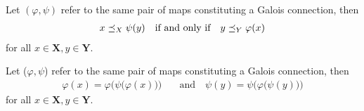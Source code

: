 \begin{proposition}
	\label{proposition:fundamental-galois} Let $(\varphi, \psi)$ refer to the same pair of maps constituting a Galois connection,
	then
	\begin{align}
		\quad & x \preceq_{X}\psi (y) \quad \text{if and only if}\quad y \preceq_{Y}\varphi (x) \label{equation:ord-galois-4}
	\end{align}
	for all $x \in \mathbf{X}, y \in \mathbf{Y}$.
\end{proposition}

\begin{proposition}
	\label{proposition:galois-idem} Let ($\varphi, \psi$) refer to the same pair of maps constituting a Galois connection,
	then
	\begin{align}
		\varphi (x) = \varphi \Big( \psi \big( \varphi (x)\big) \Big) & \quad \text{and}\quad \psi (y) = \psi \Big( \varphi \big( \psi (y)\big) \Big)
	\end{align}
	for all $x \in \mathbf{X}, y \in \mathbf{Y}$.
\end{proposition}

